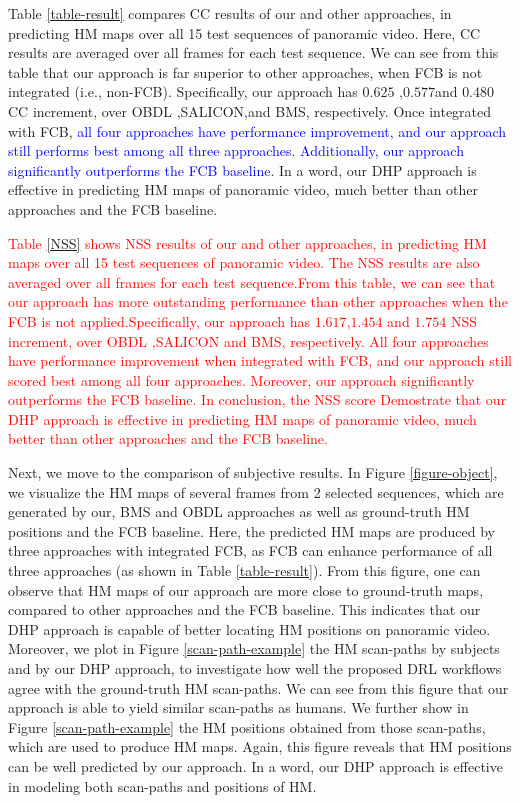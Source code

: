 \documentclass[10pt,journal,compsoc]{IEEEtran}
\begin{document}
Table \ref{table-result} compares CC results of our and other approaches, in predicting HM maps over all 15 test sequences of panoramic video.
Here, CC results are averaged over all frames for each test sequence.
We can see from this table that our approach is far superior to other approaches, when FCB is not integrated (i.e., non-FCB).
Specifically, our approach has $0.625$ ,$0.577$and $0.480$ CC increment, over OBDL ,SALICON,and BMS, respectively. Once integrated with FCB, \textcolor{blue}{all four approaches have performance improvement, and our approach still performs best among all three approaches. Additionally, our approach significantly outperforms the FCB baseline}. In a word, our DHP approach is effective in predicting HM maps of panoramic video, much better than other approaches and the FCB baseline.

\textcolor{red}{
Table \ref{NSS} shows NSS results of our and other approaches, in predicting HM maps over all 15 test sequences of panoramic video.
The NSS results are also averaged over all frames for each test sequence.From this table,
we can see that our approach has more outstanding performance than other approaches when the FCB is not applied.Specifically, our approach has $1.617$,$1.454$ and $1.754$ NSS increment, over OBDL ,SALICON and BMS, respectively. All four approaches have performance improvement when integrated with FCB, and our approach still scored best among all four approaches. Moreover, our approach significantly outperforms the FCB baseline. In conclusion, the NSS score Demostrate that our DHP approach is effective in predicting HM maps of panoramic video, much better than other approaches and the FCB baseline.
}

Next, we move to the comparison of subjective results. In Figure \ref{figure-object}, we visualize the HM maps of several frames from 2 selected sequences, which are generated by our, BMS and OBDL approaches as well as ground-truth HM positions and the FCB baseline. Here, the predicted HM maps are produced by three approaches with integrated FCB, as FCB can enhance performance of all three approaches (as shown in Table \ref{table-result}). From this figure, one can observe that HM maps of our approach are more close to ground-truth maps, compared to other approaches and the FCB baseline. This indicates that our DHP approach is capable of better locating HM positions on panoramic video. Moreover, we plot in Figure \ref{scan-path-example} the HM scan-paths by subjects and by our DHP approach, to investigate how well the proposed DRL workflows agree with the ground-truth HM scan-paths. We can see from this figure that our approach is able to yield similar scan-paths as humans. We further show in Figure \ref{scan-path-example} the HM positions obtained from those scan-paths, which are used to produce HM maps. Again, this figure reveals that HM positions can be well predicted by our approach. In a word, our DHP approach is effective in modeling both scan-paths and positions of HM.
\end{document}
